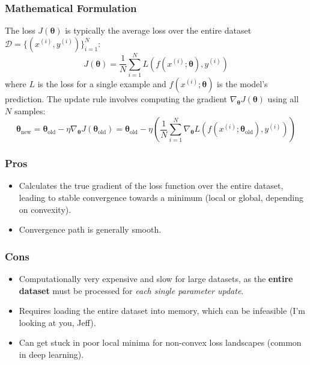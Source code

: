 \documentclass{article}
\newcommand{\btheta}{\bm{\theta}}
\begin{document}
\subsubsection{Mathematical Formulation}
The loss $J(\btheta)$ is typically the average loss over the entire dataset $\mathcal{D} = \{(x^{(i)}, y^{(i)})\}_{i=1}^N$:
\begin{equation}
    J(\btheta) = \frac{1}{N} \sum_{i=1}^{N} L(f(x^{(i)}; \btheta), y^{(i)})
\end{equation}
where $L$ is the loss for a single example and $f(x^{(i)}; \btheta)$ is the model's prediction. The update rule involves computing the gradient $\nabla_{\btheta} J(\btheta)$ using all $N$ samples:
\begin{equation}
    \btheta_{\text{new}} = \btheta_{\text{old}} - \eta \nabla_{\btheta} J(\btheta_{\text{old}}) = \btheta_{\text{old}} - \eta \left( \frac{1}{N} \sum_{i=1}^{N} \nabla_{\btheta} L(f(x^{(i)}; \btheta_{\text{old}}), y^{(i)}) \right)
\end{equation}

\subsubsection{Pros}
\begin{itemize}
    \item Calculates the true gradient of the loss function over the entire dataset, leading to stable convergence towards a minimum (local or global, depending on convexity).
    \item Convergence path is generally smooth.
\end{itemize}

\subsubsection{Cons}
\begin{itemize}
    \item Computationally very expensive and slow for large datasets, as the \textbf{entire dataset} must be processed for \emph{each single parameter update}.
    \item Requires loading the entire dataset into memory, which can be infeasible (I'm looking at you, Jeff).
    \item Can get stuck in poor local minima for non-convex loss landscapes (common in deep learning).
\end{itemize}
\end{document}

